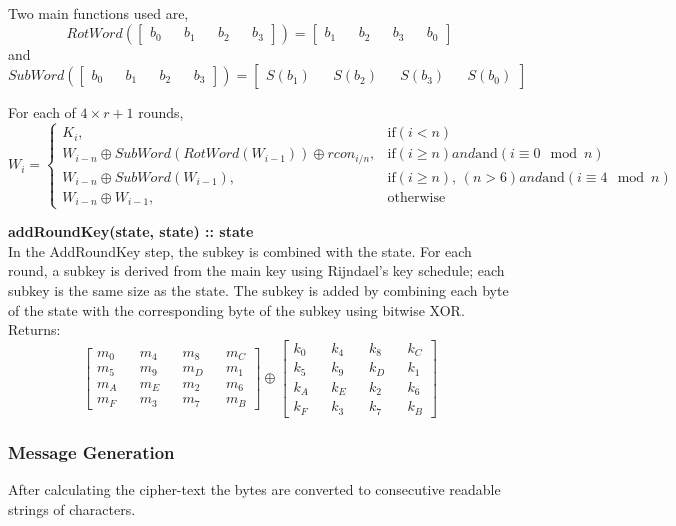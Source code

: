 Two main functions used are,
$$
RotWord(
\begin{bmatrix}
b_0 && b_1 && b_2 && b_3
\end{bmatrix}
) =
\begin{bmatrix}
b_1 && b_2 && b_3 && b_0
\end{bmatrix}
$$
and
$$
SubWord(
\begin{bmatrix}
b_0 && b_1 && b_2 && b_3
\end{bmatrix}
) =
\begin{bmatrix}
S(b_1) && S(b_2) && S(b_3) && S(b_0)
\end{bmatrix}
$$

For each of $ 4 \times r + 1 $ rounds,
$$
W_i =
\begin{cases}
K_i, & \text{if} (i < n) \\
W_{i-n} \oplus SubWord(RotWord(W_{i-1})) \oplus rcon_{i/n}, & \text{if} (i \geq n) and \text{and} (i \equiv 0 \mod n) \\
W_{i-n} \oplus SubWord(W_{i-1}), & \text{if} (i \geq n) \text{, } (n > 6) and \text{and} (i \equiv 4 \mod n) \\
W_{i-n} \oplus W_{i-1}, & \text{otherwise}
\end{cases}
$$

\textbf{addRoundKey(state, state) :: state} \\
In the AddRoundKey step, the subkey is combined with the state. For each round, a subkey is derived from the main key using Rijndael's key schedule; each subkey is the same size as the state. The subkey is added by combining each byte of the state with the corresponding byte of the subkey using bitwise XOR.
Returns:
$$
\begin{bmatrix}
m_0 && m_4 && m_8 && m_C \\
m_5 && m_9 && m_D && m_1 \\
m_A && m_E && m_2 && m_6 \\
m_F && m_3 && m_7 && m_B
\end{bmatrix}
\oplus
\begin{bmatrix}
k_0 && k_4 && k_8 && k_C \\
k_5 && k_9 && k_D && k_1 \\
k_A && k_E && k_2 && k_6 \\
k_F && k_3 && k_7 && k_B
\end{bmatrix}
$$

\subsubsection{Message Generation}
After calculating the cipher-text the bytes are converted to consecutive readable strings of characters.

